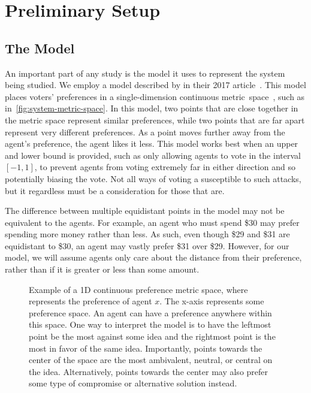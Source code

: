 \section{Preliminary Setup}\label{sec:preliminary-setup}

\subsection{The Model}\label{subsec:the-model}
An important part of any study is the model it uses to represent the system being
studied.
We employ a model described by  in their 2017
article~\cite{Cohensius2017}.
This model places voters' preferences in a single-dimension continuous
metric~space~\systemspace, such as in~\autoref{fig:system-metric-space}.
In this model, two points that are close together in the metric space represent
similar preferences, while two points that are far apart represent very different
preferences.
As a point moves further away from the agent's preference, the agent likes it less.
This model works best when an upper and lower bound is provided, such as only
allowing agents to vote in the interval $[-1, 1]$, to prevent agents from voting
extremely far in either direction and so potentially biasing the vote.
Not all ways of voting a susceptible to such attacks, but it regardless must be a
consideration for those that are.

The difference between multiple equidistant points in the model may not be equivalent
to the agents.
For example, an agent who must spend \$30 may prefer spending more money rather than
less.
As such, even though \$29 and \$31 are equidistant to \$30, an agent may vastly
prefer \$31 over \$29.
However, for our model, we will assume agents only care about the distance from their
preference, rather than if it is greater or less than some amount.

\begin{figure}[htbp]
    \centering
    
    \caption{
        Example of a 1D continuous preference metric space, where  represents
        the preference of agent $x$.
        The x-axis represents some preference space.
        An agent can have a preference anywhere within this space.
        One way to interpret the model is to have the leftmost point be the most
        against some idea and the rightmost point is the most in favor of the same idea.
        Importantly, points towards the center of the space are the most ambivalent,
        neutral, or central on the idea.
        Alternatively, points towards the center may also prefer some type of
        compromise or alternative solution instead.
    }
    \label{fig:system-metric-space}
\end{figure}

